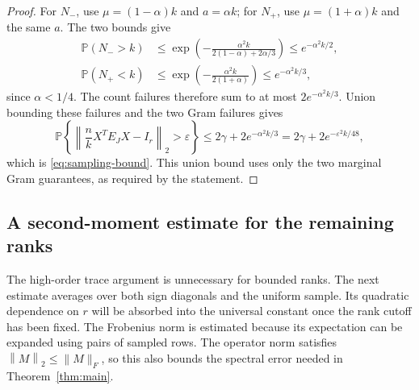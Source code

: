 \documentclass[11pt]{article}
\theoremstyle{definition}
\theoremstyle{remark}
\theoremstyle{plain}
\newcommand{\Prob}{\mathbb P}
\newcommand{\norm}[1]{\left\lVert#1\right\rVert_2}
\begin{document}
\begin{proof}
For $N_-$, use $\mu=(1-\alpha)k$ and $a=\alpha k$; for
$N_+$, use $\mu=(1+\alpha)k$ and the same $a$. The two bounds give
\[
 \begin{aligned}
 \Prob(N_->k)
   &\le\exp\left(-\frac{\alpha^2k}{2(1-\alpha)+2\alpha/3}\right)
      \le e^{-\alpha^2k/2},\\
 \Prob(N_+<k)
   &\le\exp\left(-\frac{\alpha^2k}{2(1+\alpha)}\right)
      \le e^{-\alpha^2k/3},
 \end{aligned}
\]
since $\alpha<1/4$. The count failures therefore sum to at most
$2e^{-\alpha^2k/3}$. Union bounding these failures and the two
Gram failures gives
\[
 \Prob\left\{\norm{\frac nkX^TE_JX-I_r}>\varepsilon\right\}
       \le2\gamma+2e^{-\alpha^2k/3}
       =2\gamma+2e^{-\varepsilon^2k/48},
\]
which is \eqref{eq:sampling-bound}. This union bound uses only the
two marginal Gram guarantees, as required by the statement.
\end{proof}

\subsection{A second-moment estimate for the remaining ranks}

The high-order trace argument is unnecessary for bounded ranks.
The next estimate averages over both sign diagonals and the uniform
sample. Its quadratic dependence on $r$ will be absorbed into the
universal constant once the rank cutoff has been fixed. The
Frobenius norm is estimated because its
expectation can be expanded using pairs of sampled rows. The operator
norm satisfies $\norm{M}\le\|M\|_F$, so this also bounds the
spectral error needed in Theorem~\ref{thm:main}.
\end{document}
